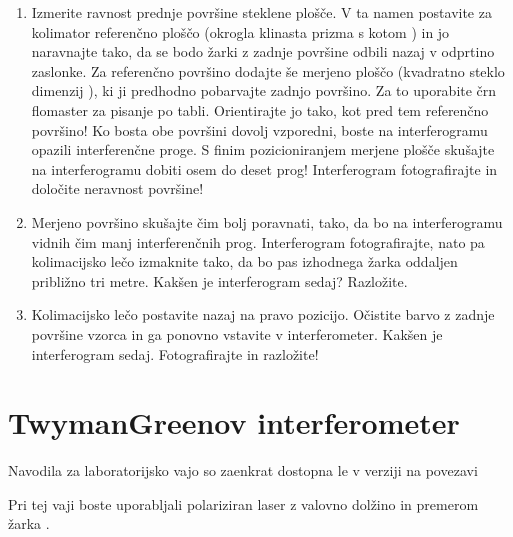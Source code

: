 \documentclass[letterpaper,10pt,english]{sphinxmanual}
\begin{document}
\begin{enumerate}
\item {} 
\sphinxAtStartPar
Izmerite ravnost prednje površine steklene plošče. V ta namen postavite za kolimator referenčno ploščo (okrogla klinasta prizma s kotom ) in jo naravnajte tako, da se bodo žarki z zadnje površine odbili nazaj v odprtino zaslonke. Za referenčno površino dodajte še merjeno ploščo (kvadratno steklo dimenzij ), ki ji predhodno pobarvajte zadnjo površino. Za to uporabite črn flomaster za pisanje po tabli. Orientirajte jo tako, kot pred tem referenčno površino! Ko bosta obe površini dovolj vzporedni, boste na interferogramu opazili interferenčne proge. S finim pozicioniranjem merjene plošče skušajte na interferogramu dobiti osem do deset prog! Interferogram fotografirajte in določite neravnost površine!

\item {} 
\sphinxAtStartPar
Merjeno površino skušajte čim bolj poravnati, tako, da bo na interferogramu vidnih čim manj interferenčnih prog. Interferogram fotografirajte, nato pa kolimacijsko lečo izmaknite tako, da bo pas izhodnega žarka oddaljen približno tri metre. Kakšen je interferogram sedaj? Razložite.

\item {} 
\sphinxAtStartPar
Kolimacijsko lečo postavite nazaj na pravo pozicijo. Očistite barvo z zadnje površine vzorca in ga ponovno vstavite v interferometer. Kakšen je interferogram sedaj. Fotografirajte in razložite!

\end{enumerate}


\chapter{Twyman\sphinxhyphen{}Greenov interferometer}
\label{\detokenize{twyman_green:twyman-greenov-interferometer}}\label{\detokenize{twyman_green:twyman-green}}\label{\detokenize{twyman_green::doc}}
\sphinxAtStartPar
Navodila za laboratorijsko vajo so zaenkrat dostopna le v  verziji na povezavi 

\sphinxAtStartPar
Pri tej vaji boste uporabljali polariziran  laser z valovno dolžino  in premerom žarka \sphinxstyleemphasis{0.8 mm}.
\end{document}
